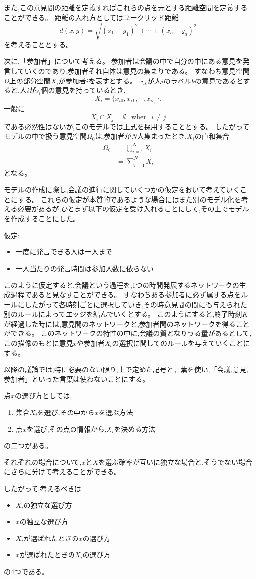また,この意見間の距離を定義すればこれらの点を元とする距離空間を定義することができる。
距離の入れ方としてはユークリッド距離
\[d(x, y) = \sqrt{(x_{1} - y_{1})^{2} + \cdots + (x_{a} - y_{a})^{2}}\]
を考えることとする。


次に,「参加者」について考える。
参加者は会議の中で自分の中にある意見を発言していくのであり,参加者それ自体は意見の集まりである。
すなわち意見空間$\Omega$上の部分空間$X_{i}$が参加者$i$を表すとする。
$x_{ik}$が人$i$のラベル$k$の意見であるとすると,人$i$が$s_{i}$個の意見を持っているとき,
\[X_{i} = \{x_{i0}, x_{i1}, \cdots , x_{is_{i}}\}.\]
一般に
\[X_{i}\cap X_{j} = \emptyset\ \ \  \text{when}\ \ \ i \neq j\]
である必然性はないが,このモデルでは上式を採用することとする。
したがってモデルの中で扱う意見空間$\Omega_{0}$は,参加者が$N$人集まったとき,$X_{i}$の直和集合
\begin{align}\Omega_{0} &= \bigcup_{i = 1}^{N} X_{i} \nonumber \\
&= \sum_{i=1}^{N} X_{i} \end{align}
となる。


モデルの作成に際し,会議の進行に関していくつかの仮定をおいて考えていくことにする。
これらの仮定が本質的であるような場合にはまた別のモデル化を考える必要があるが,ひとまず以下の仮定を受け入れることにして,その上でモデルを作成することにした。


仮定:
\begin{itemize}
    \item 一度に発言できる人は一人まで
    \item 一人当たりの発言時間は参加人数に依らない
\end{itemize}

このように仮定すると,会議という過程を,1つの時間発展するネットワークの生成過程であると見なすことができる。
すなわちある参加者に必ず属する点をルールにしたがって各時刻ごとに選択していき,その時意見間の間にも与えられた別のルールによってエッジを結んでいくとする。
このようにすると,終了時刻$K$が経過した時には,意見間のネットワークと,参加者間のネットワークを得ることができる。
このネットワークの特性の中に,会議の質となりうる量があるとして,この描像のもとに意見$x$や参加者$X_{i}$の選択に関してのルールを与えていくことにする。


以降の議論では,特に必要のない限り,上で定めた記号と言葉を使い,「会議,意見,参加者」といった言葉は使わないことにする。


点$x$の選び方としては,
\begin{enumerate}
    \item 集合$X_{i}$を選び,その中から$x$を選ぶ方法
    \item 点$x$を選び,その点の情報から,$X_{i}$を決める方法
\end{enumerate}
の二つがある。


それぞれの場合について,$x$と$X$を選ぶ確率が互いに独立な場合と,そうでない場合にさらに分けて考えることができる。


したがって,考えるべきは
\begin{itemize}
    \item $X_{i}$の独立な選び方
    \item $x$の独立な選び方
    \item $X_{i}$が選ばれたときの$x$の選び方
    \item $x$が選ばれたときの$X_{i}$の選び方
\end{itemize}
の4つである。

